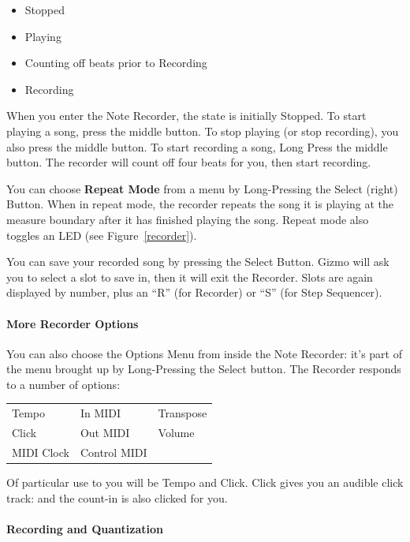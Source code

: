 \documentclass{article}
\begin{document}
\begin{itemize}
\item Stopped
\item Playing
\item Counting off beats prior to Recording
\item Recording
\end{itemize}

When you enter the Note Recorder, the state is initially Stopped.  To start playing a song, press the middle button.  To stop playing (or stop recording), you also press the middle button.  To start recording a song, Long Press the middle button.  The recorder will count off four beats for you, then start recording.

You can choose {\bf Repeat Mode} from a menu by Long-Pressing the Select (right) Button.  When in repeat mode, the recorder repeats the song it is playing at the measure boundary after it has finished playing the song.  Repeat mode also toggles an LED (see Figure~\ref{recorder}).

You can save your recorded song by pressing the Select Button.  Gizmo will ask you to select a slot to save in, then it will exit the Recorder.  Slots are again displayed by number, plus an ``R'' (for Recorder) or ``S'' (for Step Sequencer).

\paragraph{More Recorder Options}  
You can also choose the Options Menu from inside the Note Recorder: it's part of the menu brought up by Long-Pressing the Select button.  The Recorder responds to a number of options:

\vspace{1em}
\begin{tabular}{lll}
Tempo& 		In MIDI&		Transpose	\\
Click& 			Out MIDI& 	Volume	\\
MIDI Clock& 			Control MIDI	\\
\end{tabular}

\vspace{1em}
Of particular use to you will be Tempo and Click.  Click gives you an audible click track: and the count-in is also clicked for you.

\paragraph{Recording and Quantization}
\end{document}
